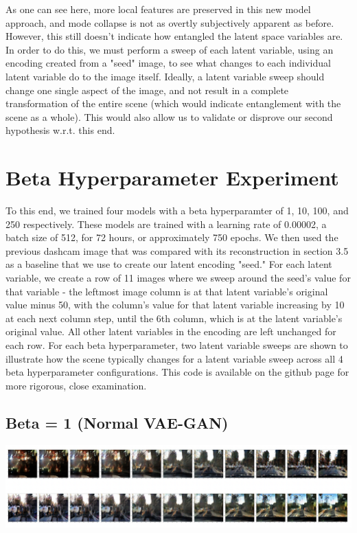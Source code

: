 \documentclass{article}
\begin{document}
As one can see here, more local features are preserved in this new model approach, and mode collapse is not as overtly subjectively apparent as before. However, this still doesn't indicate how entangled the latent space variables are. In order to do this, we must perform a sweep of each latent variable, using an encoding created from a "seed" image, to see what changes to each individual latent variable do to the image itself. Ideally, a latent variable sweep should change one single aspect of the image, and not result in a complete transformation of the entire scene (which would indicate entanglement with the scene as a whole). This would also allow us to validate or disprove our second hypothesis w.r.t. this end.
\section{Beta Hyperparameter Experiment}
To this end, we trained four models with a beta hyperparamter of 1, 10, 100, and 250 respectively. These models are trained with a learning rate of 0.00002, a batch size of 512, for 72 hours, or approximately 750 epochs. We then used the previous dashcam image that was compared with its reconstruction in section 3.5 as a baseline that we use to create our latent encoding "seed." For each latent variable, we create a row of 11 images where we sweep around the seed's value for that variable - the leftmost image column is at that latent variable's original value minus 50, with the column's value for that latent variable increasing by 10 at each next column step, until the 6th column, which is at the latent variable's original value. All other latent variables in the encoding are left unchanged for each row. For each beta hyperparameter, two latent variable sweeps are shown to illustrate how the scene typically changes for a latent variable sweep across all 4 beta hyperparameter configurations. This code is available on the github page for more rigorous, close examination.
\subsection{Beta = 1 (Normal VAE-GAN)}
\includegraphics[scale=0.5]{resultBeta1.png} \\
\end{document}
